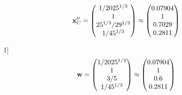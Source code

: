 \documentclass[10pt,a4paper]{article}
\begin{document}
	\[
		\bold{x}''_{C} = 
		\begin{pmatrix}
			{1} / {{2025^ {1 / 3}}} \\
			{1}{} \\
			{{25^ {1 / 3}}} / {{2}{9^ {1 / 3}}} \\
			{1} / {{45^ {1 / 3}}} \\
		\end{pmatrix}
		\approx
		\begin{pmatrix}
			0.07904  \\
			1        \\
			0.7029   \\
			0.2811   \\
		\end{pmatrix}
	\]

	1]
	\[
		\bold{w} = 
		\begin{pmatrix}
			{1} / {{2025^ {1 / 3}}} \\
			{1}{} \\
			{{3}} / {{5}} \\
			{1} / {{45^ {1 / 3}}} \\
		\end{pmatrix}
		\approx
		\begin{pmatrix}
			0.07904  \\
			1        \\
			0.6      \\
			0.2811   \\
		\end{pmatrix}
	\]
\end{document}
